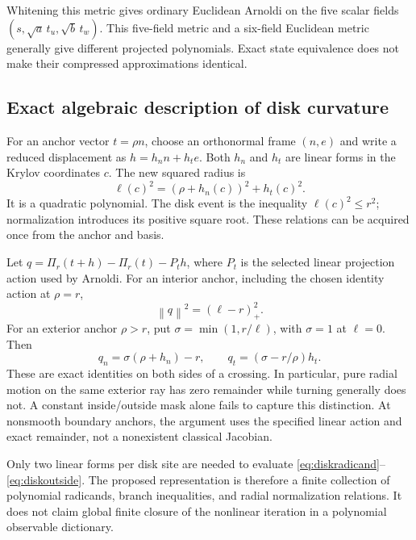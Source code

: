 \documentclass[journal]{IEEEtran}
\theoremstyle{definition}
\newcommand{\norm}[1]{\left\lVert#1\right\rVert}
\begin{document}
Whitening this metric gives ordinary Euclidean Arnoldi on the five scalar
fields $(s,\sqrt a\,t_u,\sqrt b\,t_w)$. This five-field metric and a six-field Euclidean metric generally give
different projected polynomials. Exact state equivalence does not make
their compressed approximations identical.

\subsection{Exact algebraic description of disk curvature}
For an anchor vector $t=\rho n$, choose an orthonormal frame $(n,e)$ and
write a reduced displacement as $h=h_n n+h_t e$. Both $h_n$ and $h_t$ are
linear forms in the Krylov coordinates $c$. The new squared radius is
\begin{equation}
 \ell(c)^2=(\rho+h_n(c))^2+h_t(c)^2. \label{eq:diskradicand}
\end{equation}
It is a quadratic polynomial. The disk event is the inequality
$\ell(c)^2\leq r^2$; normalization introduces its positive square root.
These relations can be acquired once from the anchor and basis.

Let $q=\Pi_r(t+h)-\Pi_r(t)-P_t h$, where $P_t$ is the selected linear
projection action used by Arnoldi. For an interior anchor, including the
chosen identity action at $\rho=r$,
\begin{equation}
 \norm{q}^2=(\ell-r)_+^2. \label{eq:diskinside}
\end{equation}
For an exterior anchor $\rho>r$, put $\sigma=\min(1,r/\ell)$, with
$\sigma=1$ at $\ell=0$. Then
\begin{equation}
 q_n=\sigma(\rho+h_n)-r,\qquad
 q_t=(\sigma-r/\rho)h_t. \label{eq:diskoutside}
\end{equation}
These are exact identities on both sides of a crossing. In particular,
pure radial motion on the same exterior ray has zero remainder while
turning generally does not. A constant inside/outside mask alone fails to
capture this distinction. At nonsmooth boundary anchors, the argument uses
the specified linear action and exact remainder, not a nonexistent classical
Jacobian.

Only two linear forms per disk site are needed to evaluate
\eqref{eq:diskradicand}--\eqref{eq:diskoutside}. The proposed representation
is therefore a finite collection of polynomial radicands, branch inequalities,
and radial normalization relations. It does not claim global finite closure
of the nonlinear iteration in a polynomial observable dictionary.
\end{document}
